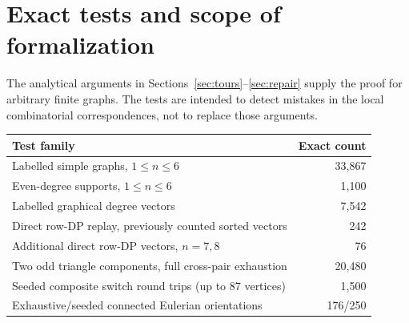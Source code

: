 \documentclass[11pt]{article}
\theoremstyle{remark}\newtheorem{remark}[theorem]{Remark}
\begin{document}
\section{Exact tests and scope of formalization}
The analytical arguments in Sections~\ref{sec:tours}--\ref{sec:repair} supply the proof for arbitrary finite graphs. The tests are intended to detect mistakes in the local combinatorial correspondences, not to replace those arguments.
\begin{center}
\begin{tabular}{lr}
\toprule
Test family & Exact count\\
\midrule
Labelled simple graphs, $1\le n\le6$ & 33,867\\
Even-degree supports, $1\le n\le6$ & 1,100\\
Labelled graphical degree vectors & 7,542\\
Direct row-DP replay, previously counted sorted vectors & 242\\
Additional direct row-DP vectors, $n=7,8$ & 76\\
Two odd triangle components, full cross-pair exhaustion & 20,480\\
Seeded composite switch round trips (up to 87 vertices) & 1,500\\
Exhaustive/seeded connected Eulerian orientations & 176/250\\
\bottomrule
\end{tabular}
\end{center}
\end{document}
